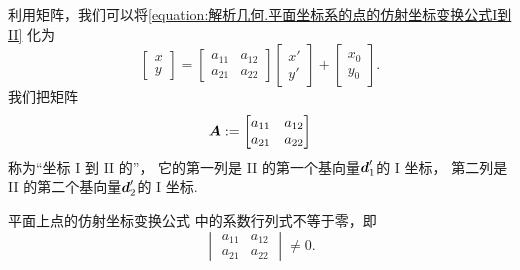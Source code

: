 利用矩阵，我们可以将\cref{equation:解析几何.平面坐标系的点的仿射坐标变换公式I到II}
化为\begin{equation}\label{equation:解析几何.平面坐标系的点的仿射坐标变换公式I到II.矩阵形式1}
	\begin{bmatrix}
		x \\ y
	\end{bmatrix}
	= \begin{bmatrix}
		a_{11} & a_{12} \\
		a_{21} & a_{22}
	\end{bmatrix} \begin{bmatrix}
		x' \\ y'
	\end{bmatrix} + \begin{bmatrix}
		x_0 \\ y_0
	\end{bmatrix}.
\end{equation}
我们把矩阵\begin{equation*}
	\boldsymbol{A}
	:=
	\begin{bmatrix}
		a_{11} & a_{12} \\
		a_{21} & a_{22}
	\end{bmatrix}
\end{equation*}
称为“坐标 I 到 II 的”，
它的第一列是 II 的第一个基向量\(\boldsymbol{d}_1'\)的 I 坐标，
第二列是 II 的第二个基向量\(\boldsymbol{d}_2'\)的 I 坐标.

\begin{theorem}
平面上点的仿射坐标变换公式 
中的系数行列式不等于零，即\begin{equation*}
	\begin{vmatrix}
		a_{11} & a_{12} \\
		a_{21} & a_{22}
	\end{vmatrix} \neq 0.
\end{equation*}
\end{theorem}

